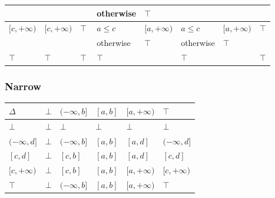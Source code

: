 \documentclass{beamer}
\begin{document}
\begin{frame}
\begin{table}[]
{\begin{tabular}{|l|l|ll|ll|ll|l|}
                                    &                                 & \multicolumn{1}{l|}{}                           &                                 & \multicolumn{1}{l|}{otherwise}               & $\top$         & \multicolumn{1}{l|}{}                           &                                 &                         \\ \hline
    \multirow{2}{*}{$[c, +\infty)$} & \multirow{2}{*}{$[c, +\infty)$} & \multicolumn{2}{l|}{\multirow{2}{*}{$\top$}}                                      & \multicolumn{1}{l|}{$a \le c$}               & $[a, +\infty)$ & \multicolumn{1}{l|}{$a \le c$}                  & $[a, +\infty)$                  & \multirow{2}{*}{$\top$} \\ \cline{5-8}
                                    &                                 & \multicolumn{2}{l|}{}                                                             & \multicolumn{1}{l|}{otherwise}               & $\top$         & \multicolumn{1}{l|}{otherwise}                  & $\top$                          &                         \\ \hline
    $\top$                          & $\top$                          & \multicolumn{2}{l|}{$\top$}                                                       & \multicolumn{2}{l|}{$\top$}                                   & \multicolumn{2}{l|}{$\top$}                                                       & $\top$                  \\ \hline
    \end{tabular}}
    \end{table}
\end{frame}

\begin{frame}
    \frametitle{Narrow}
\begin{table}[]
    \begin{tabular}{|l|l|l|l|l|l|}
    \hline
    $\Delta$       & $\bot$ & $(-\infty, b]$ & $[a, b]$ & $[a, +\infty)$ & $\top$         \\ \hline
    $\bot$         & $\bot$ & $\bot$         & $\bot$   & $\bot$         & $\bot$         \\ \hline
    $(-\infty, d]$ & $\bot$ & $(-\infty, b]$ & $[a, b]$ & $[a, d]$       & $(-\infty, d]$ \\ \hline
    $[c, d]$       & $\bot$ & $[c, b]$       & $[a, b]$ & $[a, d]$       & $[c, d]$       \\ \hline
    $[c, +\infty)$ & $\bot$ & $[c, b]$       & $[a, b]$ & $[a, +\infty)$ & $[c, +\infty)$ \\ \hline
    $\top$         & $\bot$ & $(-\infty, b]$ & $[a, b]$ & $[a, +\infty)$ & $\top$         \\ \hline
    \end{tabular}
    \end{table}
\end{frame}
\end{document}

